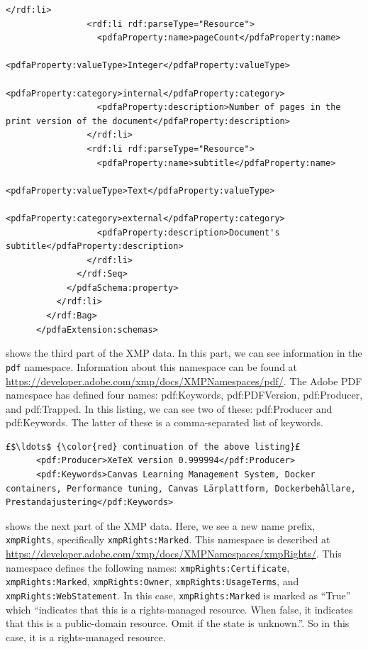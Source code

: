 \documentclass[12pt, twoside]{article}
\begin{document}
\begin{lstlisting}[style=myXML,
caption={Second part of the XML metadata embedded in a PDF file (some reformatting has been done to fit the text in the borders)}, label={lst:pdfinfoOutputPart2}]
                </rdf:li>
                <rdf:li rdf:parseType="Resource">
                  <pdfaProperty:name>pageCount</pdfaProperty:name>
                  <pdfaProperty:valueType>Integer</pdfaProperty:valueType>
                  <pdfaProperty:category>internal</pdfaProperty:category>
                  <pdfaProperty:description>Number of pages in the print version of the document</pdfaProperty:description>
                </rdf:li>
                <rdf:li rdf:parseType="Resource">
                  <pdfaProperty:name>subtitle</pdfaProperty:name>
                  <pdfaProperty:valueType>Text</pdfaProperty:valueType>
                  <pdfaProperty:category>external</pdfaProperty:category>
                  <pdfaProperty:description>Document's subtitle</pdfaProperty:description>
                </rdf:li>
              </rdf:Seq>
            </pdfaSchema:property>
          </rdf:li>
        </rdf:Bag>
      </pdfaExtension:schemas>
\end{lstlisting}

 shows the third part of the \gls{XMP} data. In this part, we can see information in the \texttt{pdf} namespace. Information about this namespace can be found at \url{https://developer.adobe.com/xmp/docs/XMPNamespaces/pdf/}. The Adobe \gls{PDF} namespace has defined four names: pdf:Keywords, pdf:PDFVersion, pdf:Producer, and pdf:Trapped. In this listing, we can see two of these: pdf:Producer and pdf:Keywords. The latter of these is a comma-separated list of keywords.

\begin{lstlisting}[style=myXML,
caption={{The \texttt{pdf}-prefix metadata embedded in a PDF file (some reformatting has been done to fit the text in the boarders)}}, label={lst:pdfinfoOutputPart3}]
£$\ldots$ {\color{red} continuation of the above listing}£ 
      <pdf:Producer>XeTeX version 0.999994</pdf:Producer>
      <pdf:Keywords>Canvas Learning Management System, Docker containers, Performance tuning, Canvas Lärplattform, Dockerbehållare, Prestandajustering</pdf:Keywords>
\end{lstlisting}

 shows the next part of the \gls{XMP} data. Here, we see a new name prefix, \texttt{xmpRights}, specifically \texttt{xmpRights:Marked}. This namespace is described at \url{https://developer.adobe.com/xmp/docs/XMPNamespaces/xmpRights/}. This namespace defines the following names: \texttt{xmpRights:Certificate}, \texttt{xmpRights:Marked}, \texttt{xmpRights:Owner}, \texttt{xmpRights:UsageTerms}, and \texttt{xmpRights:WebStatement}. In this case, \texttt{xmpRights:Marked} is marked as \enquote{True} which \enquote{indicates that this is a rights-managed resource. When false, it indicates that this is a public-domain resource. Omit if the state is unknown.}. So in this case, it is a rights-managed resource.
\end{document}
